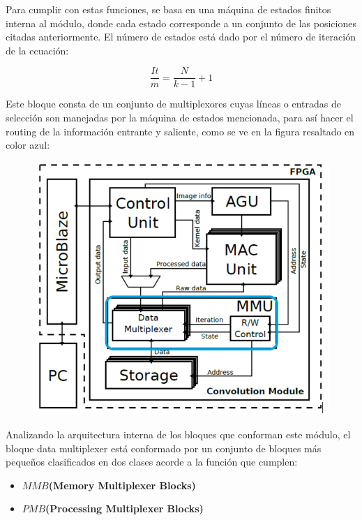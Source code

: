 \documentclass[a4paper]{article}
\begin{document}
Para cumplir con estas funciones, se basa en una máquina de estados finitos interna al módulo, donde cada estado corresponde a un conjunto de las posiciones citadas anteriormente.
El número de estados está dado por el número de iteración de la ecuación:

\begin{equation}\label{niter}
  \frac{It}{m} = \frac{N}{k-1} + 1
\end{equation}

Este bloque consta de un conjunto de multiplexores cuyas líneas o entradas de selección son manejadas por la máquina de estados mencionada, para así hacer el routing de la información entrante y saliente, como se ve en la figura resaltado en color azul:
\begin{figure}[H]
\centering
\includegraphics[scale=0.5]{arq_blue.png}
\caption{}
\label{mmu_location}
\end{figure}

Analizando la arquitectura interna de los bloques que conforman este módulo, el bloque data multiplexer está conformado por un conjunto de bloques más pequeños clasificados en dos clases acorde a la función que cumplen:
\begin{frame}{}
\begin{itemize}

 \item \textbf{$MMB$(Memory Multiplexer Blocks)}
  \item \textbf{$PMB$(Processing Multiplexer Blocks)}

\end{itemize}
\end{frame}
\end{document}

